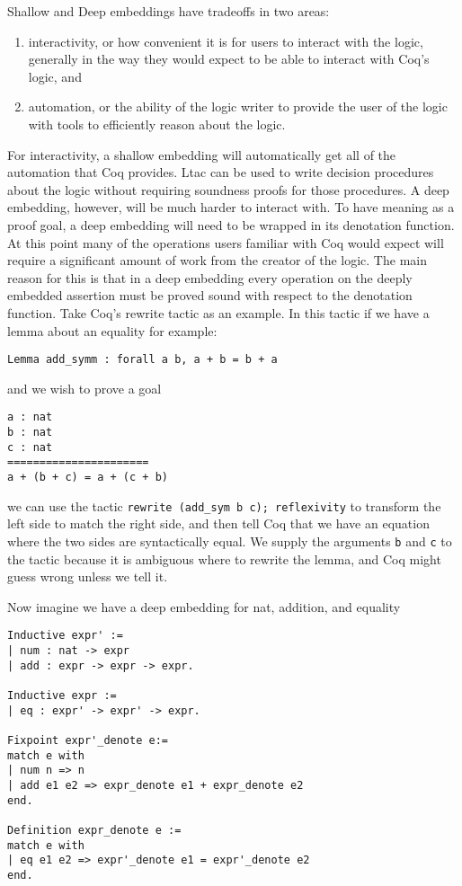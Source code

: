 \documentclass{puthesis}
\begin{document}
Shallow and Deep embeddings have tradeoffs in two areas:

\begin{enumerate}
\item interactivity, or how convenient it is for users to interact
  with the logic, generally in the way they would expect to be able to
  interact with Coq's logic, and
\item automation, or the ability of the logic writer to provide the
  user of the logic with tools to efficiently reason about the logic.
\end{enumerate}

For interactivity, a shallow embedding will automatically get all of
the automation that Coq provides. Ltac can be used to write decision
procedures about the logic without requiring soundness proofs for
those procedures. A deep embedding, however, will be much harder to
interact with. To have meaning as a proof goal, a deep embedding will
need to be wrapped in its denotation function. At this point many of
the operations users familiar with Coq would expect will require a
significant amount of work from the creator of the logic. The main
reason for this is that in a deep embedding every operation on the
deeply embedded assertion must be proved sound with respect to the
denotation function. Take Coq's rewrite tactic as an example. In this
tactic if we have a lemma about an equality for example:

\begin{lstlisting}
Lemma add_symm : forall a b, a + b = b + a
\end{lstlisting}

and we wish to prove a goal 

\begin{lstlisting}
a : nat
b : nat
c : nat
======================
a + (b + c) = a + (c + b) 
\end{lstlisting}

we can use the tactic \lstinline|rewrite (add_sym b c); reflexivity|
to transform the left side to match the right side, and then tell Coq
that we have an equation where the two sides are syntactically
equal. We supply the arguments \lstinline|b| and \lstinline|c| to the
tactic because it is ambiguous where to rewrite the lemma, and Coq
might guess wrong unless we tell it.

Now imagine we have a deep embedding for nat, addition, and equality

\begin{lstlisting}
Inductive expr' :=
| num : nat -> expr
| add : expr -> expr -> expr.

Inductive expr :=
| eq : expr' -> expr' -> expr.

Fixpoint expr'_denote e:=
match e with
| num n => n
| add e1 e2 => expr_denote e1 + expr_denote e2
end.

Definition expr_denote e :=
match e with
| eq e1 e2 => expr'_denote e1 = expr'_denote e2
end.
\end{lstlisting} 
\end{document}
